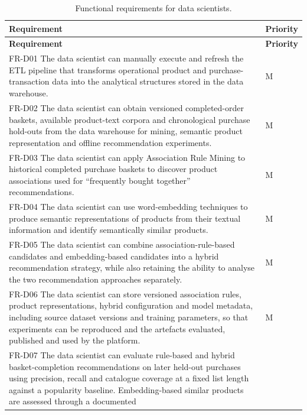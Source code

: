 \documentclass[a4paper,12pt]{article}
\newcommand{\tablestyle}{%
  \small\setstretch{1.05}%
  \renewcommand{\arraystretch}{1.25}%
  \setlength{\extrarowheight}{3pt}%
  \arrayrulecolor{tableborder}%
}
\newcommand{\req}[1]{\textsf{\small #1}}
\begin{document}
{\tablestyle
\begin{longtable}{|L{\dimexpr\textwidth-2cm-4\arrayrulewidth\relax}|C{2cm}|}
  \caption{Functional requirements for data scientists.}
  \label{tab:fr-ds}\\
  \hline
  \textbf{Requirement} & \textbf{Priority} \\
  \hline
  \endfirsthead
  \hline
  \textbf{Requirement} & \textbf{Priority} \\
  \hline
  \endhead
  \endfoot
  \endlastfoot

  \req{FR-D01} The data scientist can manually execute and refresh the ETL pipeline that transforms
  operational product and purchase-transaction data into the analytical structures stored in the
  data warehouse. & M \\[3pt]\hline
  \req{FR-D02} The data scientist can obtain versioned completed-order baskets, available product-text
  corpora and chronological purchase hold-outs from the data warehouse for mining, semantic product
  representation and offline recommendation experiments. & M \\[3pt]\hline
  \req{FR-D03} The data scientist can apply Association Rule Mining to historical completed purchase
  baskets to discover product associations used for ``frequently bought together'' recommendations. & M \\[3pt]\hline
  \req{FR-D04} The data scientist can use word-embedding techniques to produce semantic representations of
  products from their textual information and identify semantically similar products. & M \\[3pt]\hline
  \req{FR-D05} The data scientist can combine association-rule-based candidates and embedding-based candidates
  into a hybrid recommendation strategy, while also retaining the ability to analyse the two
  recommendation approaches separately. & M \\[3pt]\hline
  \req{FR-D06} The data scientist can store versioned association rules, product representations, hybrid
  configuration and model metadata, including source dataset versions and training parameters, so
  that experiments can be reproduced and the artefacts evaluated, published and used by the platform. & M \\[3pt]\hline
  \req{FR-D07} The data scientist can evaluate rule-based and hybrid basket-completion recommendations
  on later held-out purchases using precision, recall and catalogue coverage at a fixed list length
  against a popularity baseline. Embedding-based similar products are assessed through a documented

\end{longtable}}
\end{document}
